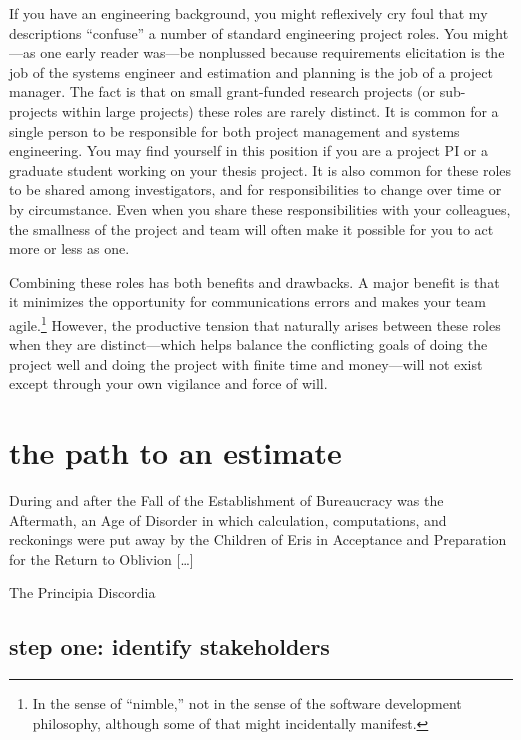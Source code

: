 \documentclass[12pt,oneside]{book}
\begin{document}
If you have an engineering background, you might reflexively cry foul that my descriptions ``confuse'' a number of standard engineering project roles. You might---as one early reader was---be nonplussed because requirements elicitation is the job of the systems engineer and estimation and planning is the job of a project manager. The fact is that on small grant-funded research projects (or sub-projects within large projects) these roles are rarely distinct. It is common for a single person to be responsible for both project management and systems engineering. You may find yourself in this position if you are a project PI or a graduate student working on your thesis project. It is also common for these roles to be shared among investigators, and for responsibilities to change over time or by circumstance. Even when you share these responsibilities with your colleagues, the smallness of the project and team will often make it possible for you to act more or less as one.

Combining these roles has both benefits and drawbacks. A major benefit is that it minimizes the opportunity for communications errors and makes your team agile.\footnote{
In the sense of ``nimble,'' not in the sense of the software development philosophy, although some of that might incidentally manifest.}
However, the productive tension that naturally arises between these roles when they are distinct---which helps balance the conflicting goals of doing the project well and doing the project with finite time and money---will not exist except through your own vigilance and force of will.

\chapter*{the path to an estimate}
\label{scrivauto:13}

\epigraph{During and after the Fall of the Establishment of Bureaucracy was the Aftermath, an Age of Disorder in which calculation, computations, and reckonings were put away by the Children of Eris in Acceptance and Preparation for the Return to Oblivion [{\dots}]}{The Principia Discordia}

\section*{step one: identify stakeholders}
\label{scrivauto:14}
\end{document}
